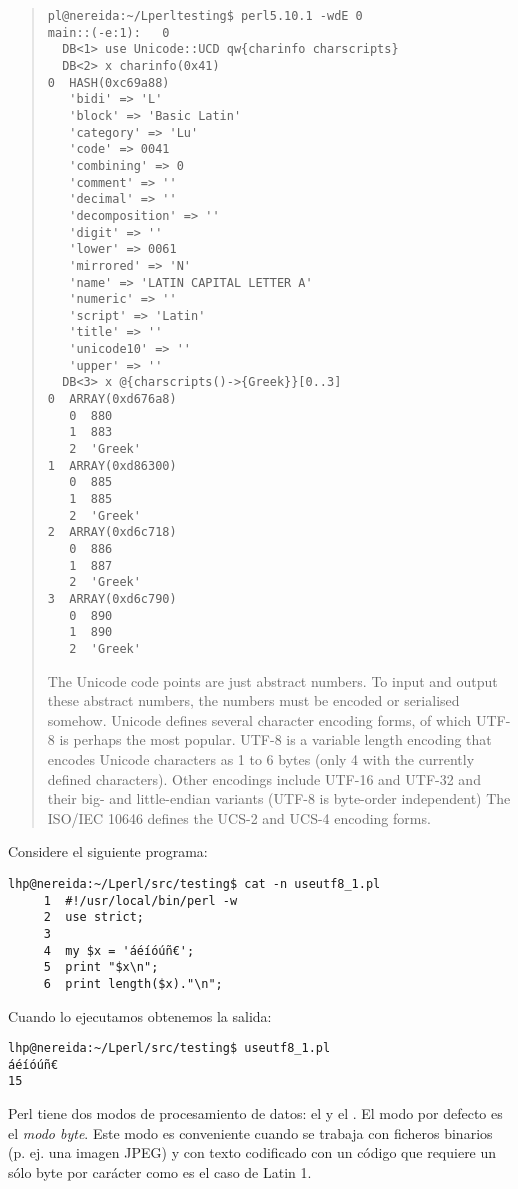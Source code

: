 \begin{htmlonly}
\begin{it}
\begin{quote}
\begin{verbatim}
pl@nereida:~/Lperltesting$ perl5.10.1 -wdE 0
main::(-e:1):   0
  DB<1> use Unicode::UCD qw{charinfo charscripts}
  DB<2> x charinfo(0x41)
0  HASH(0xc69a88)
   'bidi' => 'L'
   'block' => 'Basic Latin'
   'category' => 'Lu'
   'code' => 0041
   'combining' => 0
   'comment' => ''
   'decimal' => ''
   'decomposition' => ''
   'digit' => ''
   'lower' => 0061
   'mirrored' => 'N'
   'name' => 'LATIN CAPITAL LETTER A'
   'numeric' => ''
   'script' => 'Latin'
   'title' => ''
   'unicode10' => ''
   'upper' => ''
  DB<3> x @{charscripts()->{Greek}}[0..3]
0  ARRAY(0xd676a8)
   0  880
   1  883
   2  'Greek'
1  ARRAY(0xd86300)
   0  885
   1  885
   2  'Greek'
2  ARRAY(0xd6c718)
   0  886
   1  887
   2  'Greek'
3  ARRAY(0xd6c790)
   0  890
   1  890
   2  'Greek'
\end{verbatim}

The Unicode code points are just abstract numbers. To input and output
these abstract numbers, the numbers must be encoded or serialised
somehow. Unicode defines several character encoding forms, of which UTF-8
is perhaps the most popular. UTF-8 is a variable length encoding that
encodes Unicode characters as 1 to 6 bytes (only 4 with the currently
defined characters). Other encodings include UTF-16 and UTF-32 and their
big- and little-endian variants (UTF-8 is byte-order independent) The
ISO/IEC 10646 defines the UCS-2 and UCS-4 encoding forms.
\end{quote}
\end{it}

\begin{htmlonly}


Considere el siguiente programa:
\begin{verbatim}
lhp@nereida:~/Lperl/src/testing$ cat -n useutf8_1.pl
     1  #!/usr/local/bin/perl -w
     2  use strict;
     3
     4  my $x = 'áéíóúñ€';
     5  print "$x\n";
     6  print length($x)."\n";
\end{verbatim}
Cuando lo ejecutamos obtenemos la salida:
\begin{verbatim}
lhp@nereida:~/Lperl/src/testing$ useutf8_1.pl
áéíóúñ€
15
\end{verbatim}
Perl tiene dos modos de procesamiento de datos: el  y el .
El modo por defecto es el \emph{modo byte}.
Este modo es conveniente cuando se trabaja con ficheros binarios (p. ej. una imagen JPEG) 
y con texto codificado con un código que requiere un sólo byte por carácter como es el caso
de Latin 1.


\end{htmlonly}
\end{htmlonly}
